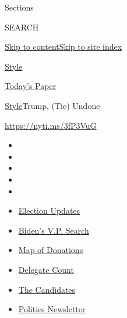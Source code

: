 Sections

SEARCH

\protect\hyperlink{site-content}{Skip to
content}\protect\hyperlink{site-index}{Skip to site index}

\href{https://www.nytimes.com/section/style}{Style}

\href{https://myaccount.nytimes.com/auth/login?response_type=cookie\&client_id=vi}{}

\href{https://www.nytimes.com/section/todayspaper}{Today's Paper}

\href{/section/style}{Style}\textbar{}Trump, (Tie) Undone

\url{https://nyti.ms/3fP3VuG}

\begin{itemize}
\item
\item
\item
\item
\item
\end{itemize}

\begin{itemize}
\item
  \href{https://www.nytimes.com/2020/08/03/us/elections/biden-vs-trump.html?action=click\&pgtype=Article\&state=default\&region=TOP_BANNER\&context=storylines_menu}{Election
  Updates}
\item
  \href{https://www.nytimes.com/article/biden-vice-president-2020.html?action=click\&pgtype=Article\&state=default\&region=TOP_BANNER\&context=storylines_menu}{Biden's
  V.P. Search}
\item
  \href{https://www.nytimes.com/interactive/2020/07/24/us/politics/trump-biden-campaign-donors.html?action=click\&pgtype=Article\&state=default\&region=TOP_BANNER\&context=storylines_menu}{Map
  of Donations}
\item
  \href{https://www.nytimes.com/interactive/2020/us/elections/delegate-count-primary-results.html?action=click\&pgtype=Article\&state=default\&region=TOP_BANNER\&context=storylines_menu}{Delegate
  Count}
\item
  \href{https://www.nytimes.com/interactive/2019/us/politics/2020-presidential-candidates.html?action=click\&pgtype=Article\&state=default\&region=TOP_BANNER\&context=storylines_menu}{The
  Candidates}
\item
  \href{https://www.nytimes.com/newsletters/politics?action=click\&pgtype=Article\&state=default\&region=TOP_BANNER\&context=storylines_menu}{Politics
  Newsletter}
\end{itemize}


